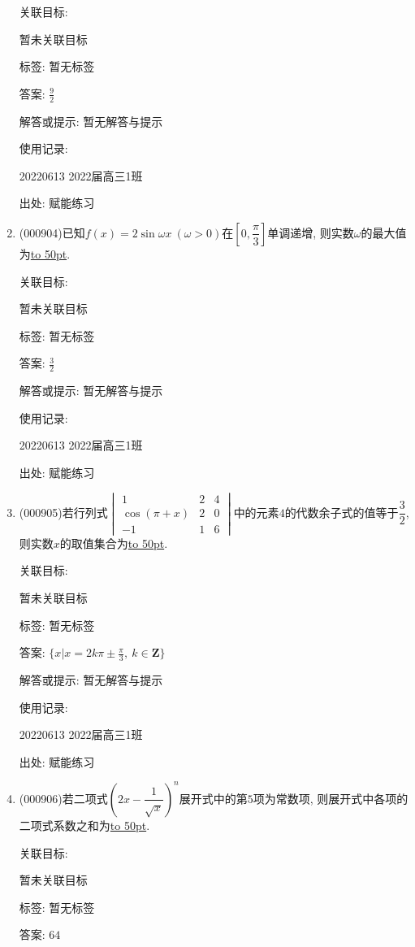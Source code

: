 \documentclass[10pt,a4paper]{article}
\newcommand{\blank}[1]{\underline{\hbox to #1pt{}}}
\begin{document}
\begin{enumerate}[1.]
关联目标:

暂未关联目标



标签: 暂无标签

答案: $\frac 92$

解答或提示: 暂无解答与提示

使用记录:

20220613	2022届高三1班	


出处: 赋能练习
\item { (000904)}已知$f(x)=2 \sin \omega x\ (\omega >0)$在$[0,\dfrac\pi 3]$单调递增, 则实数$\omega$的最大值为\blank{50}.


关联目标:

暂未关联目标



标签: 暂无标签

答案: $\frac 32$

解答或提示: 暂无解答与提示

使用记录:

20220613	2022届高三1班	


出处: 赋能练习
\item { (000905)}若行列式$\begin{vmatrix}   1 & 2 & 4 \\   \cos (\pi +x) & 2 & 0 \\   -1 & 1 & 6 \end{vmatrix}$中的元素$4$的代数余子式的值等于$\dfrac32$, 则实数$x$的取值集合为\blank{50}.


关联目标:

暂未关联目标



标签: 暂无标签

答案: $\{x|x=2k\pi\pm\frac{\pi}3, \ k\in \mathbf{Z}\}$

解答或提示: 暂无解答与提示

使用记录:

20220613	2022届高三1班	


出处: 赋能练习
\item { (000906)}若二项式$(2x-\dfrac1{\sqrt x})^n$展开式中的第$5$项为常数项, 则展开式中各项的二项式系数之和为\blank{50}.


关联目标:

暂未关联目标



标签: 暂无标签

答案: $64$


\end{enumerate}
\end{document}
